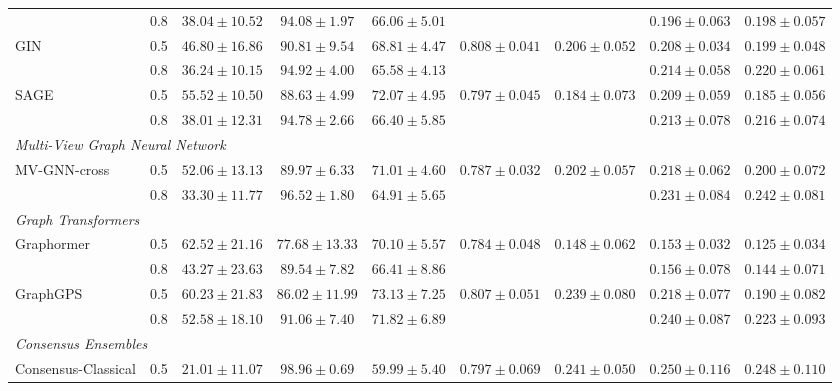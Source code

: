 \documentclass[letterpaper]{article}
\begin{document}
\begin{table}[htbp]
{\begin{tabular}{llccccccc}
 & 0.8 & $38.04 \pm 10.52$ & $94.08 \pm 1.97$ & $66.06 \pm 5.01$ &  &  & $0.196 \pm 0.063$ & $0.198 \pm 0.057$ \\
\multirow{2}{*}{GIN} & 0.5 & $46.80 \pm 16.86$ & $90.81 \pm 9.54$ & $68.81 \pm 4.47$ & \multirow{2}{*}{$0.808 \pm 0.041$} & \multirow{2}{*}{$0.206 \pm 0.052$} & $0.208 \pm 0.034$ & $0.199 \pm 0.048$ \\
 & 0.8 & $36.24 \pm 10.15$ & $94.92 \pm 4.00$ & $65.58 \pm 4.13$ &  &  & $0.214 \pm 0.058$ & $0.220 \pm 0.061$ \\
\multirow{2}{*}{SAGE} & 0.5 & $55.52 \pm 10.50$ & $88.63 \pm 4.99$ & $72.07 \pm 4.95$ & \multirow{2}{*}{$0.797 \pm 0.045$} & \multirow{2}{*}{$0.184 \pm 0.073$} & $0.209 \pm 0.059$ & $0.185 \pm 0.056$ \\
 & 0.8 & $38.01 \pm 12.31$ & $94.78 \pm 2.66$ & $66.40 \pm 5.85$ &  &  & $0.213 \pm 0.078$ & $0.216 \pm 0.074$ \\
\midrule
\multicolumn{9}{l}{\textit{Multi-View Graph Neural Network}} \\
\midrule
\multirow{2}{*}{MV-GNN-cross} & 0.5 & $52.06 \pm 13.13$ & $89.97 \pm 6.33$ & $71.01 \pm 4.60$ & \multirow{2}{*}{$0.787 \pm 0.032$} & \multirow{2}{*}{$0.202 \pm 0.057$} & $0.218 \pm 0.062$ & $0.200 \pm 0.072$ \\
 & 0.8 & $33.30 \pm 11.77$ & $96.52 \pm 1.80$ & $64.91 \pm 5.65$ &  &  & $0.231 \pm 0.084$ & $0.242 \pm 0.081$ \\
\midrule
\multicolumn{9}{l}{\textit{Graph Transformers}} \\
\midrule
\multirow{2}{*}{Graphormer} & 0.5 & {\boldmath$62.52 \pm 21.16$} & $77.68 \pm 13.33$ & $70.10 \pm 5.57$ & \multirow{2}{*}{$0.784 \pm 0.048$} & \multirow{2}{*}{$0.148 \pm 0.062$} & $0.153 \pm 0.032$ & $0.125 \pm 0.034$ \\
 & 0.8 & $43.27 \pm 23.63$ & $89.54 \pm 7.82$ & $66.41 \pm 8.86$ &  &  & $0.156 \pm 0.078$ & $0.144 \pm 0.071$ \\
\multirow{2}{*}{GraphGPS} & 0.5 & \underline{$60.23 \pm 21.83$} & $86.02 \pm 11.99$ & {\boldmath$73.13 \pm 7.25$} & \multirow{2}{*}{$0.807 \pm 0.051$} & \multirow{2}{*}{$0.239 \pm 0.080$} & $0.218 \pm 0.077$ & $0.190 \pm 0.082$ \\
 & 0.8 & $52.58 \pm 18.10$ & $91.06 \pm 7.40$ & $71.82 \pm 6.89$ &  &  & $0.240 \pm 0.087$ & $0.223 \pm 0.093$ \\
\midrule
\multicolumn{9}{l}{\textit{Consensus Ensembles}} \\
\midrule
\multirow{2}{*}{Consensus-Classical} & 0.5 & $21.01 \pm 11.07$ & $98.96 \pm 0.69$ & $59.99 \pm 5.40$ & \multirow{2}{*}{$0.797 \pm 0.069$} & \multirow{2}{*}{$0.241 \pm 0.050$} & $0.250 \pm 0.116$ & $0.248 \pm 0.110$ \\

\end{tabular}}
\end{table}
\end{document}
